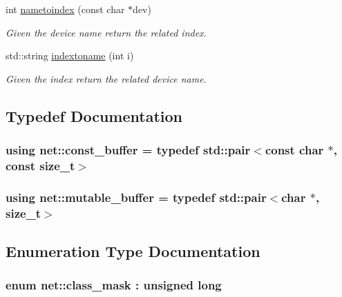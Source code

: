 \begin{DoxyCompactItemize}
int \hyperlink{namespacenet_aa90cbca6e910724bc46d5f4c2b12cddf}{nametoindex} (const char $\ast$dev)
\begin{DoxyCompactList}\small\item\em Given the device name return the related index. \end{DoxyCompactList}\item 
std\+::string \hyperlink{namespacenet_ac7628d7e4c8e89d8ada4d75c292f575f}{indextoname} (int i)
\begin{DoxyCompactList}\small\item\em Given the index return the related device name. \end{DoxyCompactList}\end{DoxyCompactItemize}


\subsection{Typedef Documentation}
\hypertarget{namespacenet_a05639001760fe5164b163078b5ccc2c0}{
\subsubsection[{const\+\_\+buffer}]{\setlength{\rightskip}{0pt plus 5cm}using {\bf net\+::const\+\_\+buffer} = typedef std\+::pair$<$const char $\ast$, const size\+\_\+t$>$}}\label{namespacenet_a05639001760fe5164b163078b5ccc2c0}
\hypertarget{namespacenet_ac0df3fa0efbc044d8a2441906e8f61cb}{
\subsubsection[{mutable\+\_\+buffer}]{\setlength{\rightskip}{0pt plus 5cm}using {\bf net\+::mutable\+\_\+buffer} = typedef std\+::pair$<$char $\ast$, size\+\_\+t$>$}}\label{namespacenet_ac0df3fa0efbc044d8a2441906e8f61cb}


\subsection{Enumeration Type Documentation}
\hypertarget{namespacenet_a1dbd93552dc6ef6fbb0bb79d43ca22fd}{
\subsubsection[{class\+\_\+mask}]{\setlength{\rightskip}{0pt plus 5cm}enum {\bf net\+::class\+\_\+mask} \+: unsigned long\hspace{0.3cm}{\ttfamily [strong]}}}\label{namespacenet_a1dbd93552dc6ef6fbb0bb79d43ca22fd}


